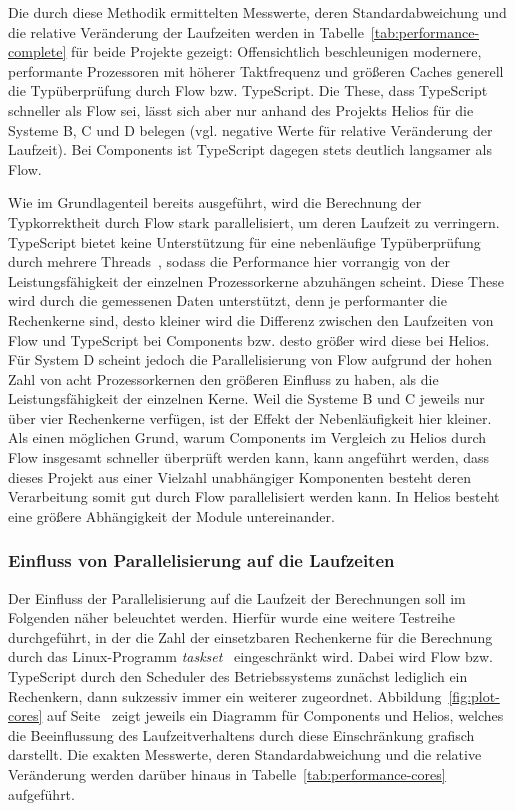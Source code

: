 Die durch diese Methodik ermittelten Messwerte, deren Standardabweichung und die relative Veränderung der Laufzeiten werden in Tabelle~\ref{tab:performance-complete} für beide Projekte gezeigt: Offensichtlich beschleunigen modernere, performante Prozessoren mit höherer Taktfrequenz und größeren Caches generell die Typüberprüfung durch Flow bzw. TypeScript. Die These, dass TypeScript schneller als Flow sei, lässt sich aber nur anhand des Projekts Helios für die Systeme B, C und D belegen (vgl. negative Werte für relative Veränderung der Laufzeit). Bei Components ist TypeScript dagegen stets deutlich langsamer als Flow.

\tablespace


Wie im Grundlagenteil bereits ausgeführt, wird die Berechnung der Typkorrektheit durch Flow stark parallelisiert, um deren Laufzeit zu verringern. TypeScript bietet keine Unterstützung für eine nebenläufige Typüberprüfung durch mehrere Threads~\autocite{TS:NO_MULTICORE}, sodass die Performance hier vorrangig von der Leistungsfähigkeit der einzelnen Prozessorkerne abzuhängen scheint. Diese These wird durch die gemessenen Daten unterstützt, denn je performanter die Rechenkerne sind, desto kleiner wird die Differenz zwischen den Laufzeiten von Flow und TypeScript bei Components bzw. desto größer wird diese bei Helios.
Für System D scheint jedoch die Parallelisierung von Flow aufgrund der hohen Zahl von acht Prozessorkernen den größeren Einfluss zu haben, als die Leistungsfähigkeit der einzelnen Kerne. Weil die Systeme B und C jeweils nur über vier Rechenkerne verfügen, ist der Effekt der Nebenläufigkeit hier kleiner. Als einen möglichen Grund, warum Components im Vergleich zu Helios durch Flow insgesamt schneller überprüft werden kann, kann angeführt werden, dass dieses Projekt aus einer Vielzahl unabhängiger Komponenten besteht deren Verarbeitung somit gut durch Flow parallelisiert werden kann. In Helios besteht eine größere Abhängigkeit der Module untereinander.

\subsubsection{Einfluss von Parallelisierung auf die Laufzeiten}

Der Einfluss der Parallelisierung auf die Laufzeit der Berechnungen soll im Folgenden näher beleuchtet werden. Hierfür wurde eine weitere Testreihe durchgeführt, in der die Zahl der einsetzbaren Rechenkerne für die Berechnung durch das Linux-Programm \textit{taskset}~\autocite{TASKSET} eingeschränkt wird. Dabei wird Flow bzw. TypeScript durch den Scheduler des Betriebssystems zunächst lediglich ein Rechenkern, dann sukzessiv immer ein weiterer zugeordnet. Abbildung~\ref{fig:plot-cores} auf Seite~\pageref{fig:plot-cores} zeigt jeweils ein Diagramm für Components und Helios, welches die Beeinflussung des Laufzeitverhaltens durch diese Einschränkung grafisch darstellt. Die exakten Messwerte, deren Standardabweichung und die relative Veränderung werden darüber hinaus in Tabelle~\ref{tab:performance-cores} aufgeführt.


